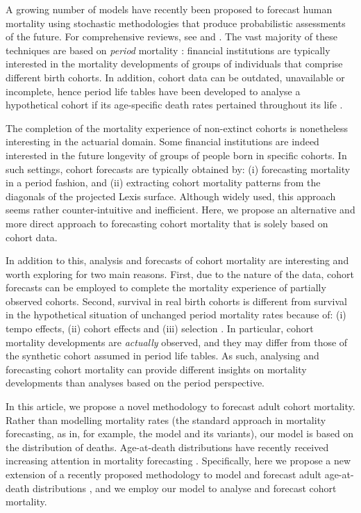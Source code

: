 \documentclass[11pt, a4paper]{article}
\begin{document}
A growing number of models have recently been proposed to forecast human mortality using stochastic methodologies that produce probabilistic assessments of the future. For comprehensive reviews, see \cite{booth2006demographic} and \cite{shang2011point}. The vast majority of these techniques are based on \textit{period} mortality \cite[see, for example,][]{lee1992modeling,cairns2006two,raftery2013bayesian}: financial institutions are typically interested in the mortality developments of groups of individuals that comprise different birth cohorts. In addition, cohort data can be outdated, unavailable or incomplete, hence period life tables have been developed to analyse a hypothetical cohort if its age-specific death rates pertained throughout its life \citep{preston2001demogr}.
 
The completion of the mortality experience of non-extinct cohorts is nonetheless interesting in the actuarial domain. Some financial institutions are indeed interested in the future longevity of groups of people born in specific cohorts. In such settings, cohort forecasts are typically obtained by: (i) forecasting mortality in a period fashion, and (ii) extracting cohort mortality patterns from the diagonals of the projected Lexis surface. Although widely used, this approach seems rather counter-intuitive and inefficient. Here, we propose an alternative and more direct approach to forecasting cohort mortality that is solely based on cohort data.

In addition to this, analysis and forecasts of cohort mortality are interesting and worth exploring for two main reasons. First, due to the nature of the data, cohort forecasts can be employed to complete the mortality experience of partially observed cohorts. Second, survival in real birth cohorts is different from survival in the hypothetical situation of unchanged period mortality rates because of: (i) tempo effects, (ii) cohort effects and (iii) selection \cite[for a full discussion, see][Sect.~2]{borgan2018cohort}. In particular, cohort mortality developments are \textit{actually} observed, and they may differ from those of the synthetic cohort assumed in period life tables. As such, analysing and forecasting cohort mortality can provide different insights on mortality developments than analyses based on the period perspective.  

In this article, we propose a novel methodology to forecast adult cohort mortality. Rather than modelling mortality rates (the standard approach in mortality forecasting, as in, for example, the \citeauthor{lee1992modeling} model and its variants), our model is based on the distribution of deaths. Age-at-death distributions have recently received increasing attention in mortality forecasting \citep{oeppen2008coherent,bergeron2017coherent,basellini2019modeling,pascariu2019maximum}. Specifically, here we propose a new extension of a recently proposed methodology to model and forecast adult age-at-death distributions \citep{basellini2019modeling}, and we employ our model to analyse and forecast cohort mortality. \par 
 
\end{document}
